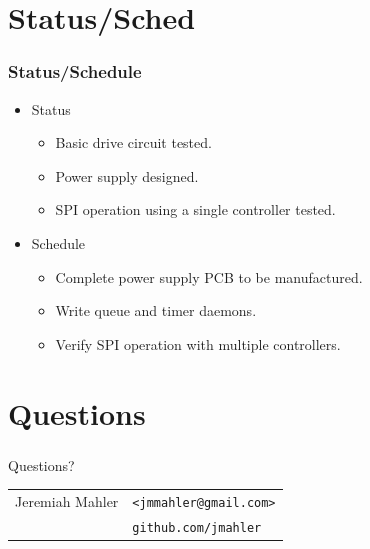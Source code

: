 \documentclass[gray]{beamer}
\begin{document}
\section{Status/Sched}
\begin{frame}
\frametitle{Status/Schedule}
\begin{itemize}
\item Status
\begin{itemize}
	\item Basic drive circuit tested.
	\item Power supply designed.
	\item SPI operation using a single controller tested.
\end{itemize}
\item Schedule
\begin{itemize}
\item Complete power supply PCB to be manufactured.
\item Write queue and timer daemons.
\item Verify SPI operation with multiple controllers.
\end{itemize}
\end{itemize}
\end{frame}

\section{Questions}
\begin{frame}[fragile]
\frametitle{}
\begin{center}
\vspace{6em}
Questions? \\
\vspace{5em}
\vspace{2em}
\begin{tabular}{ll}
Jeremiah Mahler \quad\quad\quad & \footnotesize\texttt{<jmmahler@gmail.com>} \\
				& \footnotesize\texttt{github.com/jmahler}
\end{tabular}

\end{center}
\end{frame}
\end{document}
